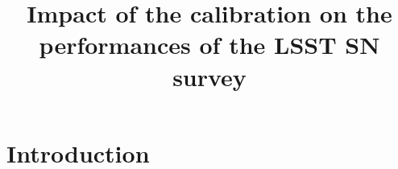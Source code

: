 \documentclass[\docopts]{\docclass}
\begin{document}
\title{ Impact of the calibration on the performances of the LSST SN survey }

\maketitlepre

\begin{abstract}
\end{abstract}


\maketitlepost

% 

\section{Introduction}
\label{sec:intro}
\end{document}

